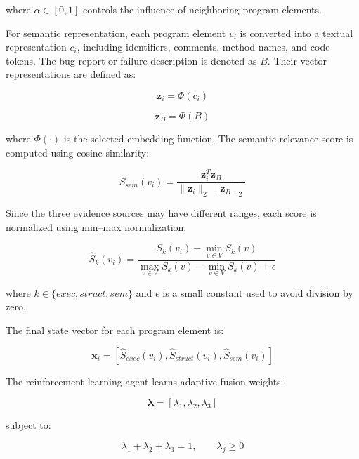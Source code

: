 \documentclass[article,article,submit,pdftex,moreauthors]{Definitions/mdpi}
\begin{document}
where $\alpha \in [0,1]$ controls the influence of neighboring program elements.

For semantic representation, each program element $v_i$ is converted into a textual representation $c_i$, including identifiers, comments, method names, and code tokens. The bug report or failure description is denoted as $B$. Their vector representations are defined as:

\begin{equation}
\mathbf{z}_i = \Phi(c_i)
\end{equation}

\begin{equation}
\mathbf{z}_B = \Phi(B)
\end{equation}

where $\Phi(\cdot)$ is the selected embedding function. The semantic relevance score is computed using cosine similarity:

\begin{equation}
S_{sem}(v_i)=
\frac{\mathbf{z}_i^{T}\mathbf{z}_B}
{\|\mathbf{z}_i\|_2\|\mathbf{z}_B\|_2}
\end{equation}

Since the three evidence sources may have different ranges, each score is normalized using min--max normalization:

\begin{equation}
\hat{S}_{k}(v_i)=
\frac{S_{k}(v_i)-\min_{v \in V}S_{k}(v)}
{\max_{v \in V}S_{k}(v)-\min_{v \in V}S_{k}(v)+\epsilon}
\end{equation}

where $k \in \{exec, struct, sem\}$ and $\epsilon$ is a small constant used to avoid division by zero.

The final state vector for each program element is:

\begin{equation}
\mathbf{x}_i=
[
\hat{S}_{exec}(v_i),
\hat{S}_{struct}(v_i),
\hat{S}_{sem}(v_i)
]
\end{equation}

The reinforcement learning agent learns adaptive fusion weights:

\begin{equation}
\boldsymbol{\lambda}
=
[\lambda_1,\lambda_2,\lambda_3]
\end{equation}

subject to:

\begin{equation}
\lambda_1+\lambda_2+\lambda_3=1,
\qquad
\lambda_j \geq 0
\end{equation}
\end{document}
